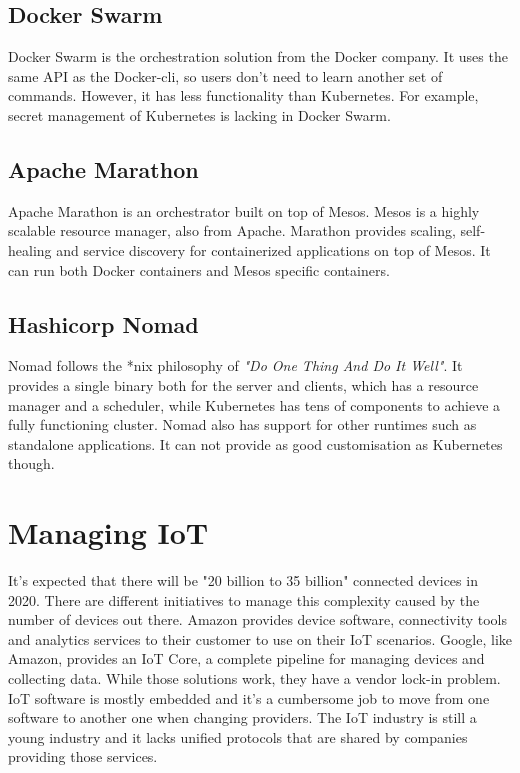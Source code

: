 \subsection*{Docker Swarm}
Docker Swarm is the orchestration solution from the Docker company. It uses the same API as the Docker-cli, so users don't need to learn another set of commands. However, it has less functionality than Kubernetes. For example, secret management of Kubernetes is lacking in Docker Swarm.

\subsection*{Apache Marathon}
Apache Marathon is an orchestrator built on top of Mesos. Mesos is a highly scalable resource manager, also from Apache. Marathon provides scaling, self-healing and service discovery for containerized applications on top of Mesos. It can run both Docker containers and Mesos specific containers.

\subsection*{Hashicorp Nomad}
Nomad follows the *nix philosophy of \textit{"Do One Thing And Do It Well"}. It provides a single binary both for the server and clients, which has a resource manager and a scheduler, while Kubernetes has tens of components to achieve a fully functioning cluster. Nomad also has support for other runtimes such as standalone applications. It can not provide as good customisation as Kubernetes though.

\section{Managing IoT}
It's expected that there will be "20 billion to 35 billion" \cite{unikernels-improve} connected devices in 2020. There are different initiatives to manage this complexity caused by the number of devices out there. Amazon provides device software, connectivity tools and analytics services to their customer to use on their IoT scenarios. Google, like Amazon, provides an IoT Core, a complete pipeline for managing devices and collecting data. While those solutions work, they have a vendor lock-in problem. IoT software is mostly embedded and it's a cumbersome job to move from one software to another one when changing providers. The IoT industry is still a young industry and it lacks unified protocols that are shared by companies providing those services.

